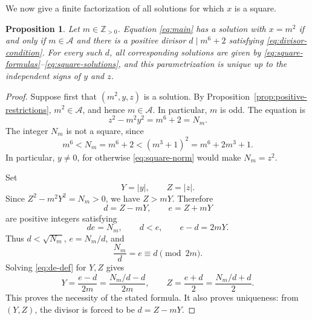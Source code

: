 \documentclass[a4paper,11pt]{amsart}
\numberwithin{equation}{section}
\newtheorem{proposition}[theorem]{Proposition}
\theoremstyle{definition}
\theoremstyle{remark}
\newcommand{\Z}{\mathbb Z}
\newcommand{\Acal}{\mathcal A}
\begin{document}
We now give a finite factorization of all solutions for which \(x\) is a
square.

\begin{proposition}\label{prop:square-case}
Let \(m\in\Z_{>0}\).  Equation \eqref{eq:main} has a solution with
\(x=m^2\) if and only if \(m\in\Acal\) and there is a positive divisor
\(d\mid m^6+2\) satisfying \eqref{eq:divisor-condition}.  For every such
\(d\), all corresponding solutions are given by
\eqref{eq:square-formulas}--\eqref{eq:square-solutions}, and this
parametrization is unique up to the independent signs of \(y\) and \(z\).
\end{proposition}

\begin{proof}
Suppose first that \((m^2,y,z)\) is a solution.  By
Proposition~\ref{prop:positive-restrictions}, \(m^2\in\Acal\), and hence
\(m\in\Acal\).  In particular, \(m\) is odd.  The equation is
\begin{equation}\label{eq:square-norm}
 z^2-m^2y^2=m^6+2=N_m.
\end{equation}
The integer \(N_m\) is not a square, since
\begin{equation}\label{eq:Nm-between-squares}
 m^6<N_m=m^6+2<(m^3+1)^2=m^6+2m^3+1.
\end{equation}
In particular, \(y\neq0\), for otherwise \eqref{eq:square-norm} would make
\(N_m=z^2\).

Set
\begin{equation}\label{eq:YZabs}
 Y=|y|,
 \qquad Z=|z|.
\end{equation}
Since \(Z^2-m^2Y^2=N_m>0\), we have \(Z>mY\).  Therefore
\begin{equation}\label{eq:de-def}
 d=Z-mY,
 \qquad
 e=Z+mY
\end{equation}
are positive integers satisfying
\begin{equation}\label{eq:de-properties}
 de=N_m,
 \qquad d<e,
 \qquad e-d=2mY.
\end{equation}
Thus \(d<\sqrt{N_m}\), \(e=N_m/d\), and
\begin{equation}\label{eq:econgd}
 \frac{N_m}{d}=e\equiv d\pmod{2m}.
\end{equation}
Solving \eqref{eq:de-def} for \(Y,Z\) gives
\begin{equation}\label{eq:YZ-from-de}
 Y=\frac{e-d}{2m}=\frac{N_m/d-d}{2m},
 \qquad
 Z=\frac{e+d}{2}=\frac{N_m/d+d}{2}.
\end{equation}
This proves the necessity of the stated formula.  It also proves uniqueness:
from \((Y,Z)\), the divisor is forced to be \(d=Z-mY\).


\end{proof}
\end{document}
